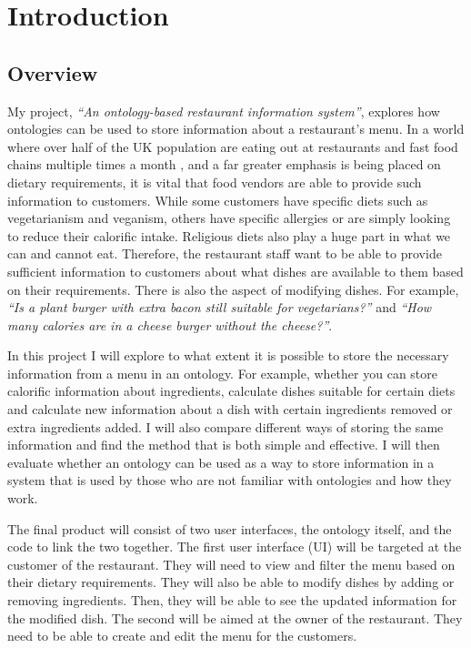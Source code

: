 \chapter{Introduction}

\section{Overview}

My project, \textit{``An ontology-based restaurant information system''}, explores how ontologies can be used to store information about a restaurant's menu. In a world where over half of the UK population are eating out at restaurants and fast food chains multiple times a month \cite{wunsch_2022}, and a far greater emphasis is being placed on dietary requirements, it is vital that food vendors are able to provide such information to customers. While some customers have specific diets such as vegetarianism and veganism, others have specific allergies or are simply looking to reduce their calorific intake. Religious diets also play a huge part in what we can and cannot eat. Therefore, the restaurant staff want to be able to provide sufficient information to customers about what dishes are available to them based on their requirements. There is also the aspect of modifying dishes. For example, \textit{``Is a plant burger with extra bacon still suitable for vegetarians?''} and \textit{``How many calories are in a cheese burger without the cheese?''}.

In this project I will explore to what extent it is possible to store the necessary information from a menu in an ontology. For example, whether you can store calorific information about ingredients, calculate dishes suitable for certain diets and calculate new information about a dish with certain ingredients removed or extra ingredients added.  I will also compare different ways of storing the same information and find the method that is both simple and effective. I will then evaluate whether an ontology can be used as a way to store information in a system that is used by those who are not familiar with ontologies and how they work.

The final product will consist of two user interfaces, the ontology itself, and the code to link the two together. The first user interface (UI) will be targeted at the customer of the restaurant. They will need to view and filter the menu based on their dietary requirements. They will also be able to modify dishes by adding or removing ingredients. Then, they will be able to see the updated information for the modified dish. The second will be aimed at the owner of the restaurant. They need to be able to create and edit the menu for the customers.

